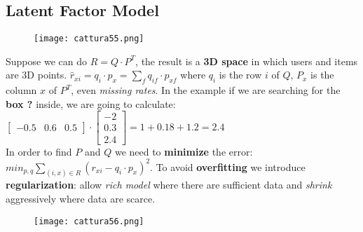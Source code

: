 \documentclass{article}
\begin{document}
\subsection{Latent Factor Model}
\begin{figure}[H]
  \centering
  \texttt{[image: cattura55.png]}
\end{figure}
Suppose we can do $R = Q \cdot P^T$, the result is a \textbf{3D space} in which users and items are 3D points. $\hat{r}_{xi} = q_{i} \cdot p_{x} = \sum_f q_{if} \cdot p_{xf}$ where $q_i$ is the row $i$ of $Q$, $P_x$ is the column $x$ of $P^T$, even \emph{missing rates}. In the example if we are searching for the \textbf{box ?} inside, we are going to calculate: $\begin{bmatrix}
-0.5 & 0.6 & 0.5
\end{bmatrix}
\cdot
\begin{bmatrix}
-2\\ 
0.3\\ 
2.4
\end{bmatrix} = 1+0.18+1.2 = 2.4$\\
In order to find $P$ and $Q$ we need to \textbf{minimize} the error: $min_{p,q} \sum_{(i,x) \in R} (r_{xi} - q_i \cdot p_x)^2$. To avoid \textbf{overfitting} we introduce \textbf{regularization}: allow \emph{rich model} where there are sufficient data and \emph{shrink} aggressively where data are scarce.
\begin{figure}[H]
  \centering
  \texttt{[image: cattura56.png]}
\end{figure}
\end{document}
